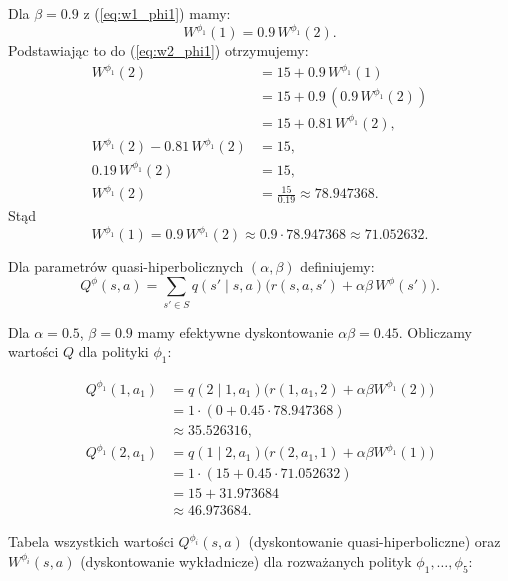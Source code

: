 Dla \(\beta=0.9\) z (\ref{eq:w1_phi1}) mamy:
\[
W^{\phi_1}(1)=0.9\,W^{\phi_1}(2).
\]
Podstawiając to do (\ref{eq:w2_phi1}) otrzymujemy:
\begin{align*}
W^{\phi_1}(2)
&= 15 + 0.9\,W^{\phi_1}(1) \\
&= 15 + 0.9\,(0.9\,W^{\phi_1}(2)) \\
&= 15 + 0.81\,W^{\phi_1}(2),\\
W^{\phi_1}(2) - 0.81\,W^{\phi_1}(2)
&= 15,\\
0.19\,W^{\phi_1}(2)
&= 15,\\
W^{\phi_1}(2) &= \frac{15}{0.19}\approx \mathbf{78.947368}.
\end{align*}
Stąd
\[
W^{\phi_1}(1)=0.9\,W^{\phi_1}(2)\approx 0.9\cdot 78.947368 \approx \mathbf{71.052632}.
\]

Dla parametrów quasi-hiperbolicznych \((\alpha,\beta)\) definiujemy:
\[
Q^\phi(s,a)
= \sum_{s'\in S} q(s'\mid s,a)\Big(r(s,a,s') + \alpha\beta\, W^\phi(s')\Big).
\]

Dla \(\alpha=0.5\), \(\beta=0.9\) mamy efektywne dyskontowanie \(\alpha\beta = 0.45\).
Obliczamy wartości $Q$ dla polityki \(\phi_1\):

\begin{align*}
Q^{\phi_1}(1,a_1)
&= q(2\mid 1,a_1)\Big(r(1,a_1,2) + \alpha\beta W^{\phi_1}(2)\Big) \\
&= 1\cdot(0 + 0.45 \cdot 78.947368) \\
&\approx \mathbf{35.526316},\\[6pt]
Q^{\phi_1}(2,a_1)
&= q(1\mid 2,a_1)\Big(r(2,a_1,1) + \alpha\beta W^{\phi_1}(1)\Big) \\
&= 1\cdot(15 + 0.45 \cdot 71.052632) \\
&= 15 + 31.973684 \\
&\approx \mathbf{46.973684}.
\end{align*}

Tabela wszystkich wartości \(Q^{\phi_i}(s,a)\) (dyskontowanie quasi-hiperboliczne) oraz \(W^{\phi_i}(s,a)\) (dyskontowanie wykładnicze) dla rozważanych polityk \(\phi_1,\dots,\phi_5\):

